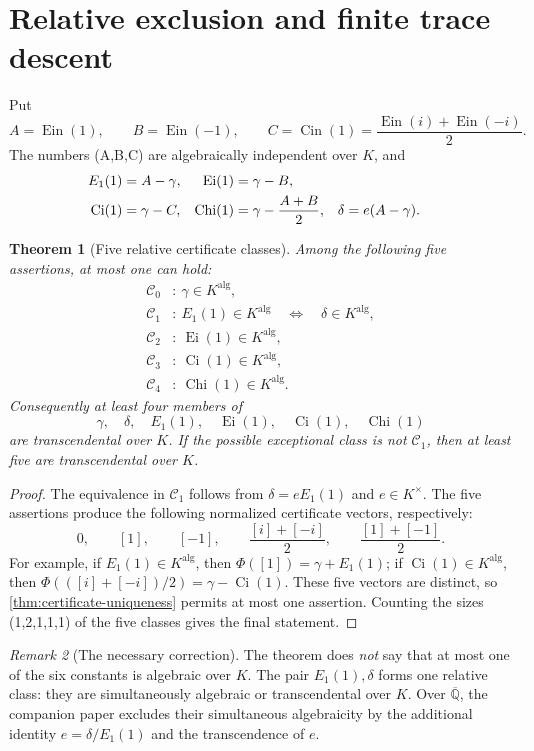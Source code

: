 \documentclass[11pt]{article}
\newtheorem{theorem}{Theorem}[section]
\theoremstyle{definition}
\theoremstyle{remark}
\newtheorem{remark}[theorem]{Remark}
\newcommand{\Qbar}{\overline{\mathbb Q}}
\newcommand{\Ein}{\operatorname{Ein}}
\newcommand{\Cin}{\operatorname{Cin}}
\newcommand{\Ei}{\operatorname{Ei}}
\newcommand{\Ci}{\operatorname{Ci}}
\newcommand{\Chi}{\operatorname{Chi}}
\begin{document}
\section{Relative exclusion and finite trace descent}
\label{sec:relative}

Put
\[
 A=\Ein(1),\qquad B=\Ein(-1),\qquad
 C=\Cin(1)=\frac{\Ein(i)+\Ein(-i)}2.
\]
The numbers (A,B,C) are algebraically independent over \(K\), and
\begin{align}
 E_1(1)&=A-\gamma,&
 \Ei(1)&=\gamma-B,\label{eq:six-identities}\\
 \Ci(1)&=\gamma-C,&
 \Chi(1)&=\gamma-\frac{A+B}{2},&
 \delta&=e(A-\gamma).\notag
\end{align}

\begin{theorem}[Five relative certificate classes]
\label{thm:five-classes}
Among the following five assertions, at most one can hold:
\begin{align*}
 \mathcal C_0&:\ \gamma\in K^{\mathrm{alg}},\\
 \mathcal C_1&:\ E_1(1)\in K^{\mathrm{alg}}
 \quad\Longleftrightarrow\quad \delta\in K^{\mathrm{alg}},\\
 \mathcal C_2&:\ \Ei(1)\in K^{\mathrm{alg}},\\
 \mathcal C_3&:\ \Ci(1)\in K^{\mathrm{alg}},\\
 \mathcal C_4&:\ \Chi(1)\in K^{\mathrm{alg}}.
\end{align*}
Consequently at least four members of
\[
 \gamma,\quad\delta,\quad E_1(1),\quad\Ei(1),\quad\Ci(1),\quad\Chi(1)
\]
are transcendental over \(K\).  If the possible exceptional class is not
\(\mathcal C_1\), then at least five are transcendental over \(K\).
\end{theorem}

\begin{proof}
The equivalence in \(\mathcal C_1\) follows from
\(\delta=eE_1(1)\) and \(e\in K^\times\).  The five assertions produce the
following normalized certificate vectors, respectively:
\[
 0,\qquad [1],\qquad[-1],\qquad
 \frac{[i]+[-i]}2,\qquad
 \frac{[1]+[-1]}2.
\]
For example, if \(E_1(1)\in K^{\mathrm{alg}}\), then
\(\Phi([1])=\gamma+E_1(1)\); if \(\Ci(1)\in K^{\mathrm{alg}}\), then
\(\Phi(([i]+[-i])/2)=\gamma-\Ci(1)\).  These five vectors are distinct, so
\cref{thm:certificate-uniqueness} permits at most one assertion.  Counting
the sizes (1,2,1,1,1) of the five classes gives the final statement.
\end{proof}

\begin{remark}[The necessary correction]
The theorem does \emph{not} say that at most one of the six constants is
algebraic over \(K\).  The pair \(E_1(1),\delta\) forms one relative class:
they are simultaneously algebraic or transcendental over \(K\).  Over
\(\Qbar\), the companion paper excludes their simultaneous algebraicity by
the additional identity \(e=\delta/E_1(1)\) and the transcendence of \(e\).
\end{remark}
\end{document}
